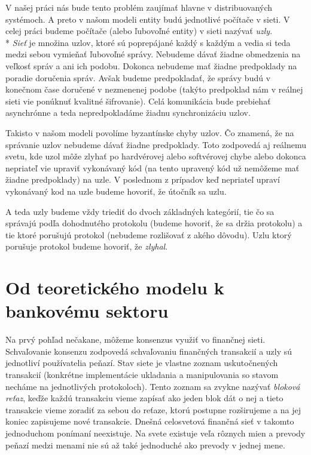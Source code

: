 V našej práci nás bude tento problém zaujímať hlavne v distribuovaných systémoch.
A preto v našom modeli entity budú jednotlivé počítače v sieti.
V celej práci budeme počítače (alebo ľubovoľné entity) v sieti nazývať 
\textit{uzly}.
\\*
\textit{Sieť} je množina uzlov, ktoré sú poprepájané každý s každým a vedia si
teda medzi sebou vymieňať ľubovoľné správy. Nebudeme dávať žiadne obmedzenia
na veľkosť správ a ani ich podobu. Dokonca nebudeme mať žiadne predpoklady na
poradie doručenia správ. Avšak budeme predpokladať, že správy budú
v konečnom čase doručené v nezmenenej podobe (takýto predpoklad nám v reálnej
sieti vie ponúknuť kvalitné šifrovanie).
Celá komunikácia bude prebiehať asynchrónne a teda nepredpokladáme žiadnu
synchronizáciu uzlov.

Takisto v našom modeli povolíme byzantínske chyby uzlov.
Čo znamená, že na správanie uzlov nebudeme dávať žiadne predpoklady.
Toto zodpovedá aj reálnemu svetu, kde uzol môže zlyhať po hardvérovej alebo
softvérovej chybe alebo dokonca nepriateľ vie upraviť vykonávaný kód (na tento
upravený kód už nemôžeme mať žiadne predpoklady) na uzle.
V poslednom z prípadov keď nepriateľ upraví vykonávaný kod na uzle budeme
hovoriť, že útočník sa  uzlu.

A teda uzly budeme vždy triediť do dvoch základných kategórií, tie čo sa správajú
podľa dohodnutého protokolu (budeme hovoriť, že sa držia protokolu) a tie ktoré
porušujú protokol (nebudeme rozlišovať z akého dôvodu). Uzlu ktorý porušuje protokol budeme hovoriť, že \textit{zlyhal}.

\section {Od teoretického modelu k bankovému sektoru}

\label{kap:theorytobank}

Na prvý pohľad nečakane, môžeme konsenzus využiť vo finančnej sieti.
Schvaľovanie konsenzu zodpovedá schvaľovaniu finančných transakcií a uzly sú
jednotliví používatelia peňazí. Stav siete je vlastne zoznam uskutočnených
transakcií (konkrétne implementácie ukladania a manipulovania so stavom necháme
na jednotlivých protokoloch).
Tento zoznam sa zvykne nazývať \textit{bloková reťaz}, keďže každú
transakciu vieme zapísať ako jeden blok dát o nej a tieto transakcie vieme
zoradiť za sebou do reťaze, ktorú postupne rozširujeme a na jej koniec
zapisujeme nové transakcie.
Dnešná celosvetová finančná sieť v takomto jednoduchom ponímaní neexistuje. Na
svete existuje veľa rôznych mien a prevody peňazí medzi menami nie sú až také
jednoduché ako prevody v jednej mene.

